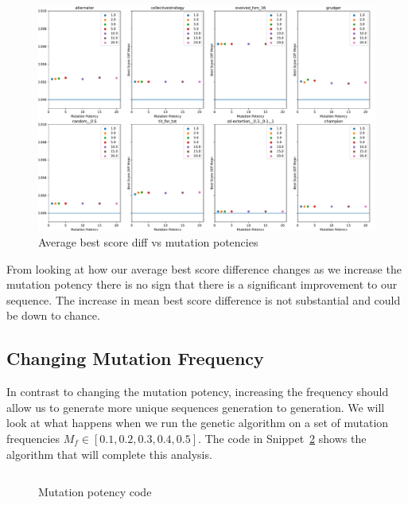 \begin{figure}[ht]
    \includegraphics[width=1.0\textwidth, center]{./img/plots/MUT_POT_bs_diff_v_pot_all.pdf}
    \caption{Average best score diff vs mutation potencies}\label{fig:MUT-POT-bs-diff-v-pot-all}
\end{figure}

From looking at how our average best score difference changes as we increase the mutation potency there is no sign that there is a significant improvement to our sequence.
The increase in mean best score difference is not substantial and could be down to chance.

\subsection{Changing Mutation Frequency}\label{subsec:changingMutationFrequency}
In contrast to changing the mutation potency, increasing the frequency should allow us to generate more unique sequences generation to generation.
We will look at what happens when we run the genetic algorithm on a set of mutation frequencies \(M_f \in [0.1,0.2,0.3,0.4,0.5]\).
The code in Snippet~\ref{code:mutationFrequencyChecker} shows the algorithm that will complete this analysis.

\begin{figure}
    \inputminted{python}{code_snippets/mutationFrequencyChecker.py}
    \caption{Mutation potency code}\label{code:mutationFrequencyChecker}
\end{figure}

